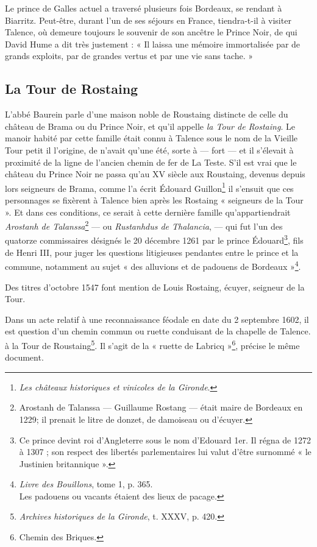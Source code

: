 Le prince de Galles actuel a traversé plusieurs fois Bordeaux, se rendant à Biarritz. Peut-être, durant l'un de ses séjours en France, tiendra-t-il à visiter Talence, où demeure toujours le souvenir de son ancêtre le Prince Noir, de qui David Hume a dit très justement : « Il laissa une mémoire immortalisée par de grands exploits, par de grandes vertus et par une vie sans tache. »

\subsection{La Tour de Rostaing}

L'abbé Baurein parle d'une maison noble de Roustaing distincte de celle du château de Brama ou du Prince Noir, et qu'il appelle \textit{la Tour de Rostaing}. Le manoir habité par cette famille était connu à Talence sous le nom de la Vieille Tour petit il l'origine, de n'avait qu'une été, sorte à — fort — et il s'élevait à proximité de la ligne de l'ancien chemin de fer de La Teste. S'il est vrai que le château du Prince Noir ne passa qu'au XV\ieme{} siècle aux Roustaing, devenus depuis lors seigneurs de Brama, comme l'a écrit Édouard Guillon\footnote{\textit{Les châteaux historiques et vinicoles de la Gironde}.} il s'ensuit que ces personnages se fixèrent à Talence bien après les Rostaing « seigneurs de la Tour ». Et dans ces conditions, ce serait à cette dernière famille qu'appartiendrait \textit{Arostanh de Talanssa}\footnote{Arostanh de Talanssa — Guillaume Rostang — était maire de Bordeaux en 1229; il prenait le litre de donzet, de damoiseau ou d'écuyer.} — ou \textit{Rustanhdus de Thalancia}, — qui fut l'un des quatorze commissaires désignés le 20 décembre 1261 par le prince Édouard\footnote{Ce prince devint roi d'Angleterre sous le nom d'Edouard 1er. Il régna de 1272 à 1307 ; son respect des libertés parlementaires lui valut d'être surnommé « le Justinien britannique ».}, fils de Henri III, pour juger les questions litigieuses pendantes entre le prince et la commune, notamment au sujet « des alluvions et de padouens de Bordeaux »\footnote{\textit{Livre des Bouillons}, tome 1, p. 365.\\Les padouens ou vacants étaient des lieux de pacage.}.

Des titres d'octobre 1547 font mention de Louis Rostaing, écuyer, seigneur de la Tour.

Dans un acte relatif à une reconnaissance féodale en date du 2 septembre 1602, il est question d'un chemin commun ou ruette conduisant de la chapelle de Talence. à la Tour de Roustaing\footnote{\textit{Archives historiques de la Gironde}, t. XXXV, p. 420.}. Il s'agit de la « ruette de Labricq »\footnote{Chemin des Briques.}, précise le même document.

